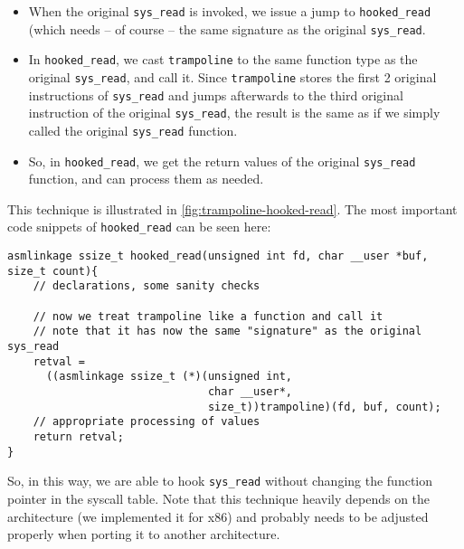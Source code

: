 \documentclass[10pt, letterpaper]{scrartcl}
\begin{document}
\begin{itemize}
\item When the original \texttt{sys\_read} is invoked, we issue a jump to \texttt{hooked\_read} (which needs -- of course -- the same signature as the original \texttt{sys\_read}.
\item In \texttt{hooked\_read}, we cast \texttt{trampoline} to the same function type as the original \texttt{sys\_read}, and call it. Since \texttt{trampoline} stores the first 2 original instructions of \texttt{sys\_read} and jumps afterwards to the third original instruction of the original \texttt{sys\_read}, the result is the same as if we simply called the original \texttt{sys\_read} function.
\item So, in \texttt{hooked\_read}, we get the return values of the original \texttt{sys\_read} function, and can process them as needed.
\end{itemize}

This technique is illustrated in \autoref{fig:trampoline-hooked-read}. The most important code snippets of \texttt{hooked\_read} can be seen here:

\begin{verbatim}
asmlinkage ssize_t hooked_read(unsigned int fd, char __user *buf, size_t count){
    // declarations, some sanity checks

    // now we treat trampoline like a function and call it
    // note that it has now the same "signature" as the original sys_read
    retval = 
      ((asmlinkage ssize_t (*)(unsigned int, 
                               char __user*,
                               size_t))trampoline)(fd, buf, count);
    // appropriate processing of values
    return retval;
}
\end{verbatim}

So, in this way, we are able to hook \texttt{sys\_read} without changing the function pointer in the syscall table. Note that this technique heavily depends on the architecture (we implemented it for x86) and probably needs to be adjusted properly when porting it to another architecture.
\end{document}
